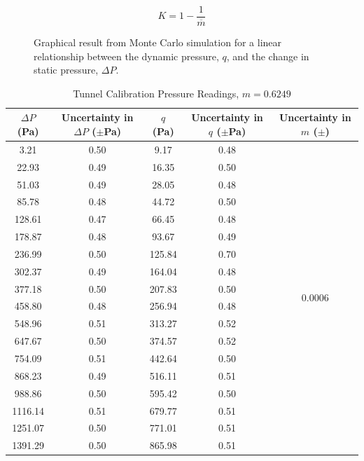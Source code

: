 \documentclass[journal,letterpaper]{IEEEtran}
\begin{document}
\begin{equation} \label{eq:K}
    K = 1 - \frac{1}{\overline{m}}
\end{equation}

\begin{figure}[H]
    \centering
    
    \caption{Graphical result from Monte Carlo simulation for a linear relationship between the dynamic pressure, $q$, and the change in static pressure, $\Delta P$.}
    \label{fig:Monte}
\end{figure}
\vspace{-8pt}
\begin{table}[H]
    \centering
    \caption{Tunnel Calibration Pressure Readings, $m = 0.6249$}
    \begin{tabular}{ccccc}
    \toprule
    $\Delta P$ (\unit{\pascal}) & \makecell{Uncertainty \\ in $\Delta P$ ($\pm$\unit{\pascal})} & $q$ (\unit{\pascal}) & \makecell{Uncertainty \\ in $q$ ($\pm$\unit{\pascal})} & \makecell{Uncertainty \\ in $m$ ($\pm$)} \\ \midrule \midrule
    3.21    & 0.50 & 9.17   & 0.48 & \multirow{18}{*}{0.0006} \\
    22.93   & 0.49 & 16.35  & 0.50 &                          \\
    51.03   & 0.49 & 28.05  & 0.48 &                          \\
    85.78   & 0.48 & 44.72  & 0.50 &                          \\
    128.61  & 0.47 & 66.45  & 0.48 &                          \\
    178.87  & 0.48 & 93.67  & 0.49 &                          \\
    236.99  & 0.50 & 125.84 & 0.70 &                          \\
    302.37  & 0.49 & 164.04 & 0.48 &                          \\
    377.18  & 0.50 & 207.83 & 0.50 &                          \\
    458.80  & 0.48 & 256.94 & 0.48 &                          \\
    548.96  & 0.51 & 313.27 & 0.52 &                          \\
    647.67  & 0.50 & 374.57 & 0.52 &                          \\
    754.09  & 0.51 & 442.64 & 0.50 &                          \\
    868.23  & 0.49 & 516.11 & 0.51 &                          \\
    988.86  & 0.50 & 595.42 & 0.50 &                          \\
    1116.14 & 0.51 & 679.77 & 0.51 &                          \\
    1251.07 & 0.50 & 771.01 & 0.51 &                          \\
    1391.29 & 0.50 & 865.98 & 0.51 &                          \\ \bottomrule
    \end{tabular}
    \label{tab:avgdData}
\end{table}
\end{document}
